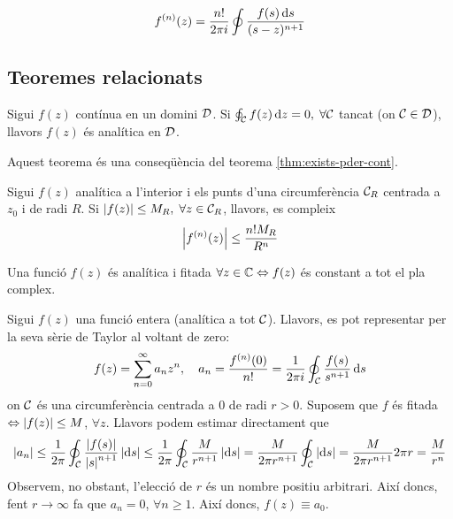 \begin{cor}
    \begin{align}
        f^{(n)}(z) = \frac{n!}{2 \pi i} \oint \frac{f(s) \mathop{}\!\mathrm{d} s}{(s-z)^{n+1}}
    \end{align}
\end{cor}

\subsection{Teoremes relacionats}
\begin{thm}[de Morera]
    Sigui $f(z)$ contínua en un domini $\mathcal{D}$. Si $\oint_{\mathcal{C}} f(z) \mathop{}\!\mathrm{d} z = 0, \; \forall \mathcal{C}$ tancat (on $\mathcal{C} \in \mathcal{D}$), llavors $f(z)$ és analítica en $\mathcal{D}$. 
\end{thm}
Aquest teorema és una conseqüència del teorema \ref{thm:exists-pder-cont}.

\begin{lem}
    Sigui $f(z)$ analítica a l'interior i els punts d'una circumferència $\mathcal{C}_{R}$ centrada a $z_{0}$ i de radi $R$. Si $\left| f(z) \right| \leq M_{R}, \; \forall z \in \mathcal{C}_{R}$, llavors, es compleix
    \begin{align}
        \left| f^{(n)}(z) \right| \leq \frac{n! M_{R}}{R^{n}}
    \end{align}
\end{lem}

\begin{thm}[de Liouville]
    Una funció $f(z)$ és analítica i fitada $\forall z \in \mathbb{C} \Leftrightarrow f(z)$ és constant a tot el pla complex.
\end{thm}
\begin{sproof}
    Sigui $f(z)$ una funció entera (analítica a tot $\mathcal{C}$). Llavors, es pot representar per la seva sèrie de Taylor al voltant de zero:
    \begin{align*}
        f(z) = \sum_{n=0}^{\infty} a_{n} z^{n}, \quad a_{n} = \frac{f^{(n)}(0)}{n!} = \frac{1}{2\pi i} \oint_{\mathcal{C}} \frac{f(s)}{s^{n+1}} \mathop{}\!\mathrm{d} s
    \end{align*}
    on $\mathcal{C}$ és una circumferència centrada a $0$ de radi $r>0$. Suposem que $f$ és fitada $\Leftrightarrow \left| f(z) \right| \leq M$, $\forall z$. Llavors podem estimar directament que 
    \begin{align*}
        \left| a_{n} \right| \leq \frac{1}{2 \pi} \oint_{\mathcal{C}} \frac{ \left| f(s) \right|}{\left| s \right|^{n+1}} \left| \mathrm{d} s \right| \leq \frac{1}{2 \pi} \oint_{\mathcal{C}} \frac{M}{r^{n+1}} \left| \mathrm{d} s \right| = \frac{M}{2 \pi r^{n+1}} \oint_{\mathcal{C}} \left| \mathrm{d} s \right| = \frac{M}{2 \pi r^{n+1}} 2 \pi r = \frac{M}{r^n}
    \end{align*}
    Observem, no obstant, l'elecció de $r$ és un nombre positiu arbitrari. Així doncs, fent $r \to \infty$ fa que $a_{n} = 0$, $\forall n \geq 1$. Així doncs, $f(z) \equiv a_{0}$.
\end{sproof}